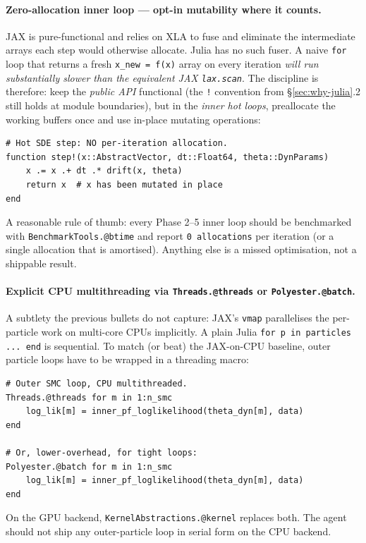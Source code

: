 \documentclass[11pt,a4paper]{article}
\begin{document}
\paragraph{Zero-allocation inner loop --- opt-in mutability where it
counts.} JAX is pure-functional and relies on XLA to fuse and
eliminate the intermediate arrays each step would otherwise
allocate. Julia has no such fuser. A naive \texttt{for} loop that
returns a fresh \texttt{x\_new = f(x)} array on every iteration
\emph{will run substantially slower than the equivalent JAX
\texttt{lax.scan}}. The discipline is therefore: keep the
\emph{public API} functional (the \texttt{!} convention from
§\ref{sec:why-julia}.2 still holds at module boundaries), but in
the \emph{inner hot loops}, preallocate the working buffers once
and use in-place mutating operations:
\begin{lstlisting}
# Hot SDE step: NO per-iteration allocation.
function step!(x::AbstractVector, dt::Float64, theta::DynParams)
    x .= x .+ dt .* drift(x, theta)
    return x  # x has been mutated in place
end
\end{lstlisting}
A reasonable rule of thumb: every Phase 2--5 inner loop should be
benchmarked with \texttt{BenchmarkTools.@btime} and report
\texttt{0 allocations} per iteration (or a single allocation that is
amortised). Anything else is a missed optimisation, not a
shippable result.

\paragraph{Explicit CPU multithreading via
\texttt{Threads.@threads} or \texttt{Polyester.@batch}.} A subtlety
the previous bullets do not capture: JAX's \texttt{vmap} parallelises
the per-particle work on multi-core CPUs implicitly. A plain Julia
\texttt{for p in particles ... end} is sequential. To match (or beat)
the JAX-on-CPU baseline, outer particle loops have to be wrapped in a
threading macro:
\begin{lstlisting}
# Outer SMC loop, CPU multithreaded.
Threads.@threads for m in 1:n_smc
    log_lik[m] = inner_pf_loglikelihood(theta_dyn[m], data)
end

# Or, lower-overhead, for tight loops:
Polyester.@batch for m in 1:n_smc
    log_lik[m] = inner_pf_loglikelihood(theta_dyn[m], data)
end
\end{lstlisting}
On the GPU backend, \texttt{KernelAbstractions.@kernel} replaces
both. The agent should not ship any outer-particle loop in serial
form on the CPU backend.
\end{document}

